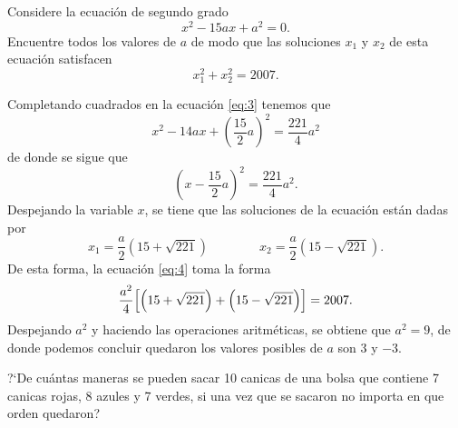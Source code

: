 \begin{Problema}{5}
  Considere la ecuaci\'on de segundo grado 
  \begin{equation}
    \label{eq:3}
    x^2-15ax+a^2=0.
  \end{equation}
  Encuentre todos los valores de $a$ de modo que las soluciones $x_1$
  y $x_2$ de esta ecuaci\'on satisfacen
  \begin{equation}
    \label{eq:4}
    x_1^2+x_2^2=2007.
  \end{equation}
\end{Problema}

\begin{Solucion}
  Completando cuadrados en la ecuaci\'on \eqref{eq:3} tenemos que 
$$
x^2-14ax+\left(\frac {15} {2}a\right)^2=\frac{221} {4} a^2
$$
de donde se sigue que 
$$
\left(x-\frac {15} {2}a\right)^2=\frac{221} {4} a^2.
$$
Despejando la variable $x$, se tiene que las soluciones de la ecuaci\'on est\'an dadas por
$$
x_1=\frac a 2 (15+\sqrt{221})\qquad\qquad  x_2=\frac a 2 (15-\sqrt{221}).
$$
De esta forma, la ecuaci\'on \eqref{eq:4} toma la forma
$$
\frac {a^2} 4 \Bigl[\left(15+\sqrt{221}\right)+\left(15-\sqrt{221}\right)\Bigr]=2007.
$$
Despejando $a^2$ y haciendo las operaciones aritm\'eticas, se obtiene que $a^2=9$, de donde podemos concluir quedaron
los valores posibles de $a$ son $3$ y $-3$.
\end{Solucion}

\begin{Problema}{6}
  ?`De cu\'antas maneras se pueden sacar 10 canicas de una bolsa que
  contiene 7 canicas rojas, 8 azules y 7 verdes, si una vez que se
  sacaron no importa en que orden quedaron?
\end{Problema}

\begin{Solucion}
  
\end{Solucion}

